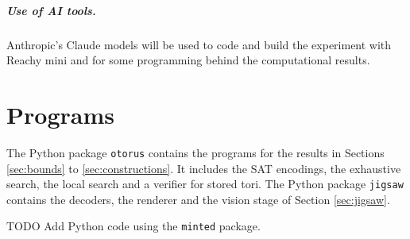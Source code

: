 \documentclass{lipics-v2021}
\newcommand{\todo}[1]{{\color{blue}TODO #1}}
\begin{document}
\subparagraph*{Use of AI tools.}
Anthropic's Claude models will be used to code and build the experiment with Reachy mini and for some programming behind the computational results.






\appendix

% 
% 
% 
% 

\section{Programs}
\label{sec:programs}

The Python package \texttt{otorus} contains the programs for the results in Sections \ref{sec:bounds} to \ref{sec:constructions}.
It includes the SAT encodings, the exhaustive search, the local search and a verifier for stored tori.
The Python package \texttt{jigsaw} contains the decoders, the renderer and the vision stage of Section \ref{sec:jigsaw}.

\todo{Add Python code using the \texttt{minted} package.}
\end{document}
